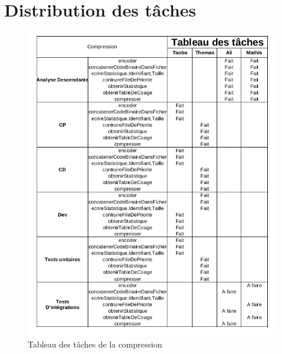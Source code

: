 \section{Distribution des tâches}
    

    \begin{figure}[h] 
        \centering      
        \includegraphics[width=1.1\textwidth]{compressionTableau.png}
        \caption{Tableau des tâches de la compression}
        \label{fig:exemple}
    \end{figure}

